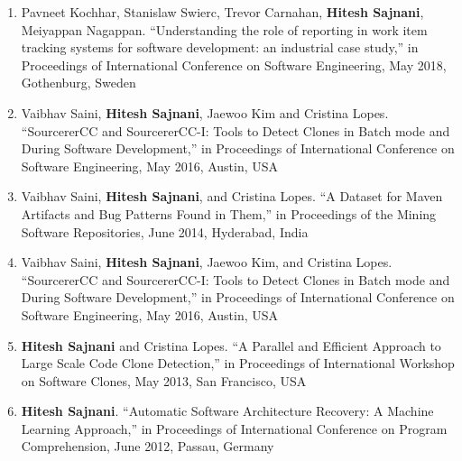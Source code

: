 \documentclass[letterpaper,11pt]{article}
\begin{document}
\begin{enumerate}

\vspace{-1pt}\item\small{Pavneet Kochhar, Stanislaw Swierc, Trevor Carnahan, \textbf{Hitesh Sajnani}, Meiyappan Nagappan. “Understanding the role of reporting in work item tracking systems for software development: an industrial case study,” in Proceedings of International Conference on Software Engineering, May 2018, Gothenburg, Sweden  }

   \vspace{-1pt}\item\small{Vaibhav Saini, \textbf{Hitesh Sajnani}, Jaewoo Kim and Cristina Lopes. “SourcererCC and
SourcererCC-I: Tools to Detect Clones in Batch mode and During Software Development,”
in Proceedings of International Conference on Software Engineering, May 2016,
Austin, USA }

   \vspace{-1pt}\item\small{Vaibhav Saini, \textbf{Hitesh Sajnani}, and Cristina Lopes. “A Dataset for Maven Artifacts and
Bug Patterns Found in Them,” in Proceedings of the Mining Software Repositories, June
2014, Hyderabad, India }
   \vspace{-1pt}\item\small{Vaibhav Saini, \textbf{Hitesh Sajnani}, Jaewoo Kim, and Cristina Lopes. “SourcererCC and
SourcererCC-I: Tools to Detect Clones in Batch mode and During Software Development,”
in Proceedings of International Conference on Software Engineering, May 2016,
Austin, USA }
   \vspace{-1pt}\item\small{\textbf{Hitesh Sajnani} and Cristina Lopes. “A Parallel and Efficient Approach to Large Scale
Code Clone Detection,” in Proceedings of International Workshop on Software Clones,
May 2013, San Francisco, USA }

   \vspace{-1pt}\item\small{\textbf{Hitesh Sajnani}. “Automatic Software Architecture Recovery: A Machine Learning
Approach,” in Proceedings of International Conference on Program Comprehension, June
2012, Passau, Germany }


\end{enumerate}
\end{document}
